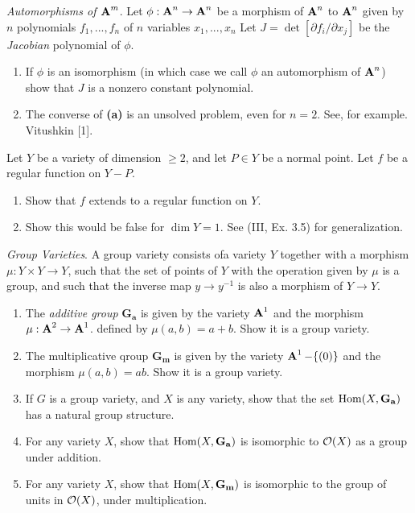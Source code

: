 \documentclass[10pt]{amsart}
\begin{document}
\begin{exercise}[3.19]
    \emph{Automorphisms of $\aa^m$}. Let $\phi: \aa^n \to \aa^n$ be a morphism of $\aa^n$ to $\aa^n$ given 
    by $n$ polynomials $f_1, ... ,f_n$ of $n$ variables $x_1, ... ,x_n$ Let $J = \det [\partial f_i/\partial x_j] $ 
    be the \emph{Jacobian} polynomial of $\phi$.
    \begin{enumerate}[itemsep=1pt]
        \item If $\phi$ is an isomorphism (in which case we call $\phi$ an automorphism of $\aa^n$) show
        that $J$ is a nonzero constant polynomial.
        \item The converse of {\bf (a)} is an unsolved problem, even for $n = 2$. See, for example.
        Vitushkin [1].
    \end{enumerate}
\end{exercise}

\begin{exercise}[3.20]
    Let $Y$ be a variety of dimension $\ge 2$, and let $P \in Y$ be a normal point. Let $f$ be a regular function 
    on $Y - P$.
    \begin{enumerate}[itemsep=1pt]
        \item Show that $f$ extends to a regular function on $Y$.
        \item Show this would be false for $\dim Y = 1$.
        See (III, Ex. 3.5) for generalization.
    \end{enumerate}
\end{exercise}

\begin{exercise}[3.21]
    \emph{Group Varieties}. A group variety consists ofa variety $Y$ together with a morphism $\mu: Y \times Y \to Y$, 
    such that the set of points of $Y$ with the operation given by $\mu$ is a group, and such that the inverse 
    map $y \to y^{-1}$ is also a morphism of $Y \to Y$.
    \begin{enumerate}[itemsep=1pt]
        \item The \emph{additive group} $\mathbf{G_a}$ is given by the variety $\aa^1$ 
        and the morphism $\mu: \aa^2 \to \aa^1$.
        defined by $\mu(a,b) = a + b$. Show it is a group variety.
        \item The multiplicative qroup $\mathbf{G_m}$ is given by the variety $\aa^1 - \{(0)\}$ and the 
        morphism $\mu(a, b) = ab$. Show it is a group variety.
        \item If $G$ is a group variety, and $X$ is any variety, show that the set $\Hom(X, \mathbf{G_a})$ has 
        a natural group structure.
        \item For any variety $X$, show that $\Hom(X,\mathbf{G_a})$ is isomorphic to $\cO(X)$ as a group
        under addition.
        \item For any variety $X$, show that $\Hom(X,\mathbf{G_m})$ is isomorphic to the group of units
        in $\cO(X)$, under multiplication.
    \end{enumerate}
\end{exercise}
\end{document}
